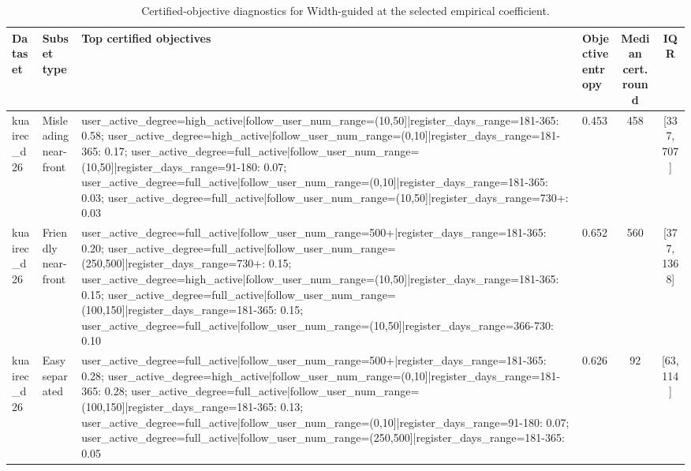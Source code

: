 \begin{table}[t]
\centering
\caption{Certified-objective diagnostics for Width-guided at the selected empirical coefficient.}
\label{tab:app-cert-objectives}
\scriptsize
\setlength{\tabcolsep}{3pt}
\begin{tabular}{llllcc}
\toprule
Dataset & Subset type & Top certified objectives & Objective entropy & Median cert. round & IQR \\
\midrule
kuairec\_d26 & Misleading near-front & user\_active\_degree=high\_active|follow\_user\_num\_range=(10,50]|register\_days\_range=181-365: 0.58; user\_active\_degree=high\_active|follow\_user\_num\_range=(0,10]|register\_days\_range=181-365: 0.17; user\_active\_degree=full\_active|follow\_user\_num\_range=(10,50]|register\_days\_range=91-180: 0.07; user\_active\_degree=full\_active|follow\_user\_num\_range=(0,10]|register\_days\_range=181-365: 0.03; user\_active\_degree=full\_active|follow\_user\_num\_range=(10,50]|register\_days\_range=730+: 0.03 & 0.453 & 458 & [337, 707] \\
kuairec\_d26 & Friendly near-front & user\_active\_degree=full\_active|follow\_user\_num\_range=500+|register\_days\_range=181-365: 0.20; user\_active\_degree=full\_active|follow\_user\_num\_range=(250,500]|register\_days\_range=730+: 0.15; user\_active\_degree=high\_active|follow\_user\_num\_range=(10,50]|register\_days\_range=181-365: 0.15; user\_active\_degree=full\_active|follow\_user\_num\_range=(100,150]|register\_days\_range=181-365: 0.15; user\_active\_degree=full\_active|follow\_user\_num\_range=(10,50]|register\_days\_range=366-730: 0.10 & 0.652 & 560 & [377, 1368] \\
kuairec\_d26 & Easy separated & user\_active\_degree=full\_active|follow\_user\_num\_range=500+|register\_days\_range=181-365: 0.28; user\_active\_degree=high\_active|follow\_user\_num\_range=(0,10]|register\_days\_range=181-365: 0.28; user\_active\_degree=full\_active|follow\_user\_num\_range=(100,150]|register\_days\_range=181-365: 0.13; user\_active\_degree=full\_active|follow\_user\_num\_range=(0,10]|register\_days\_range=91-180: 0.07; user\_active\_degree=full\_active|follow\_user\_num\_range=(250,500]|register\_days\_range=181-365: 0.05 & 0.626 & 92 & [63, 114] \\
\bottomrule
\end{tabular}
\end{table}
